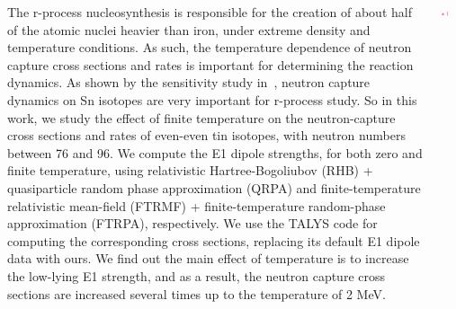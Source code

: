 \documentclass[25pt, a0paper, portrait]{tikzposter}
\begin{document}
\begin{columns}

    {The r-process nucleosynthesis is responsible for the creation of about half of
    the atomic nuclei heavier than iron, under extreme density and temperature
    conditions. As such, the temperature dependence of neutron capture cross
    sections and rates is important for determining the reaction dynamics. As shown
    by the sensitivity study in~\cite{Mumpower2016}, neutron capture dynamics
    on Sn isotopes are very important for r-process study.  So in this work, we
    study the effect of finite temperature on the neutron-capture cross sections and
    rates of even-even tin isotopes, with neutron numbers between 76 and 96.  We
    compute the E1 dipole strengths, for both zero and finite temperature, using
    relativistic Hartree-Bogoliubov (RHB) + quasiparticle random phase approximation
    (QRPA) and finite-temperature relativistic mean-field (FTRMF) +
    finite-temperature random-phase approximation (FTRPA), respectively. We use the
    TALYS code for computing the corresponding cross sections, replacing its default
    E1 dipole data with ours.  We find out the main effect of temperature is to
    increase the low-lying E1 strength, and as a result, the neutron capture cross
    sections are increased several times up to the temperature of 2 MeV.}


    {
        \begin{tikzfigure}
            \includegraphics[width=0.4\textwidth]{images/eli_logo.pdf}
        \end{tikzfigure}
    }






\end{columns}
\end{document}
